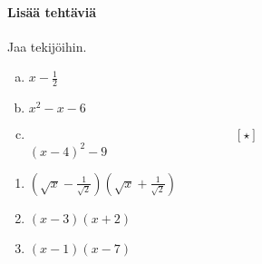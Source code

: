 \begin{tehtavasivu}
\paragraph*{Lisää tehtäviä}

\begin{tehtava}
	Jaa tekijöihin.
		\begin{enumerate}[a)]
		\item $x-\frac{1}{2}$
		\item $x^2-x-6$
		\item $$[ \star ]$$ $(x-4)^2-9$
	\end{enumerate}
	\begin{vastaus}
		\begin{enumerate}
			\item $\left(\sqrt{x}-\frac{1}{\sqrt{2}}\right)\left(\sqrt{x}+\frac{1}{\sqrt{2}}\right)$
			\item $(x-3)(x+2)$
			\item $(x-1)(x-7)$
		\end{enumerate}
	\end{vastaus}
\end{tehtava}

\end{tehtavasivu}
